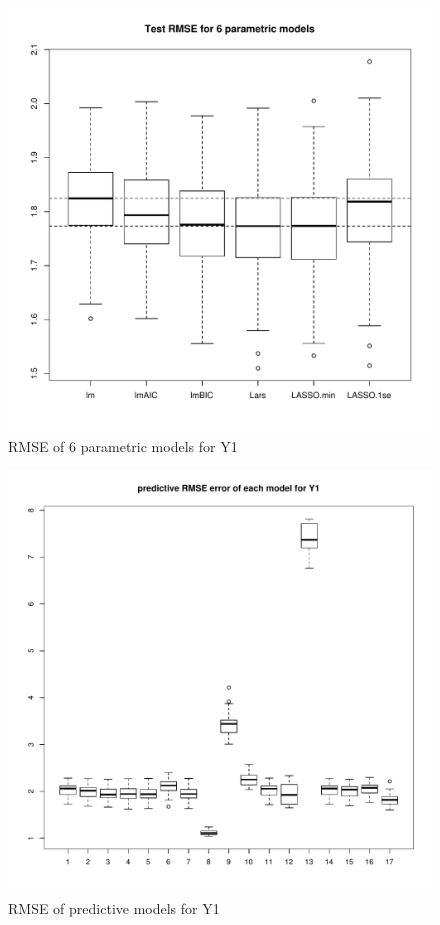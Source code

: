 \documentclass[11pt,oneside,a4paper]{article}
\begin{document}
\begin{figure}[!ht]
    \centering
	\includegraphics[scale=0.8]{./pic/reg_rmse6.pdf}
    \caption{RMSE of 6 parametric models for Y1}
 	\label{rmse6}
\end{figure}

\begin{figure}[!ht]
    \centering
	\includegraphics[scale=0.8]{./pic/reg_prediction.pdf}
    \caption{RMSE of predictive models for Y1}
 	\label{rmsep}
\end{figure}
\end{document}
